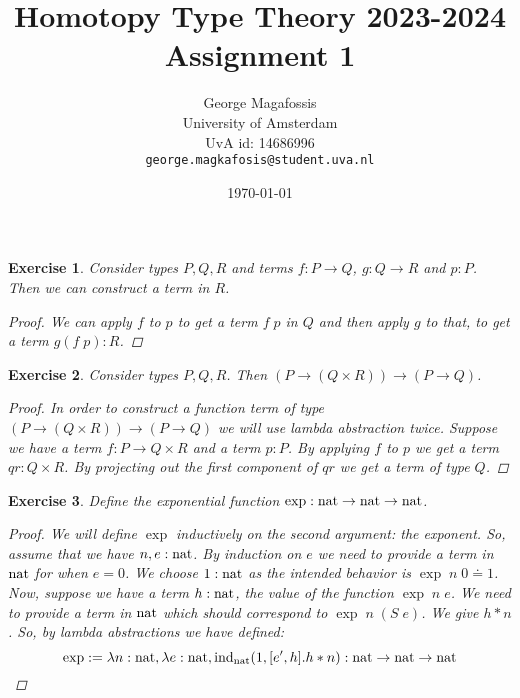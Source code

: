 \documentclass[10pt]{article}
\title{Homotopy Type Theory 2023-2024\\
       Assignment 1
      }
\date{\today}
\author{George Magafossis \\
University of Amsterdam \\
UvA id: 14686996 \\
\texttt{george.magkafosis@student.uva.nl}}
\newtheorem{exercise}{Exercise}
\begin{document}
\maketitle

\begin{exercise}
Consider types $P, Q, R$ and terms $f : P \to Q$,
$g : Q \to R$ and $p : P$. Then we can construct
a term in $R$.
\begin{proof}
We can apply $f$ to $p$ to get a term $f \; p$ in $Q$
and then apply $g$ to that, to get a term $g (f \; p) : R$.
\end{proof}
\end{exercise}

\begin{exercise}
Consider types $P, Q, R$. Then
$(P \to (Q \times R)) \to (P \to Q)$.
\begin{proof}
In order to construct a function term of type
$(P \to (Q \times R)) \to (P \to Q)$ we will use
lambda abstraction twice. Suppose we have a term
$f : P \to Q \times R$ and a term $p : P$.
By applying $f$ to $p$ we get a term $qr : Q \times R$.
By projecting out the first component of $qr$
we get a term of type $Q$.
\end{proof}
\end{exercise}


\begin{exercise}
Define the exponential function
$\text{exp} : \text{nat} \to \text{nat} \to \text{nat}$.
\begin{proof}
We will define $\exp$ inductively on the
second argument: the exponent. So, assume that
we have $n, e : \text{nat}$. By induction on $e$
we need to provide a term in $\text{nat}$
for when $e = 0$. We choose $1 : \text{nat}$
as the intended behavior is $\exp \; n \; 0 \doteq 1$.
Now, suppose we have a term $h : \text{nat}$, the
value of the function $\exp \; n \; e$.
We need to provide a term in $\text{nat}$ which should
correspond to $\exp \; n \; (S \; e)$. We give
$h * n$. So, by lambda abstractions we have defined:
\[
 \text{exp} := \lambda n : \text{nat}, \lambda e : \text{nat}, \text{ind}_{\text{nat}}(1, [e', h].h*n) : \text{nat} \to \text{nat} \to \text{nat}
\]
\end{proof}
\end{exercise}
\end{document}
